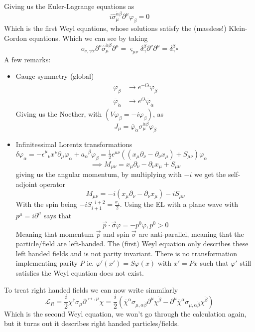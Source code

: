 \documentclass{report}
\begin{document}
Giving us the Euler-Lagrange equations as  \[
i \hat{\sigma}_\mu^{\dot{\alpha} \beta} \partial^{\mu} \varphi_\beta = 0 
\] Which is the first Weyl equations, whose solutions satisfy the (massless!) Klein-Gordon equations. Which we can see by taking \[
o_{\nu, \gamma \dot{\alpha}} \partial^{\nu} \hat{\sigma}_\mu^{\dot{\alpha} \beta} \partial^{\mu} = \varsigma_{\mu\nu} \delta_\gamma^{\beta} \partial^{\nu} \partial^{\mu} = \delta_\gamma^{\beta} \square     
\] 
A few remarks:
\begin{itemize}
  \item Gauge symmetry (global) 
    \begin{align*}
      \varphi_\beta &\to e^{-i\lambda} \varphi_\beta\\
      \overline{\varphi}_{\dot{\alpha}} &\to e^{i\lambda} \overline{\varphi}_{\dot{\alpha}} 
    \end{align*}
    Giving us the Noether, with $\left( V\varphi_\beta = -i \varphi_\beta \right) $, as \[
    J_\mu = \overline{\varphi}_{\dot{\alpha}} \sigma_\mu ^{\dot{\alpha} \beta} \varphi_\beta
    \] 
  \item Infinitessimal Lorentz transformations $\delta \varphi_\alpha = -\epsilon^{\mu}_{\text{ }\nu}  x^{\nu} \partial_\mu \varphi_\alpha + a_\alpha ^{\text{ }\beta} \varphi_\beta = \frac{1}{2} \epsilon^{\mu\nu} \left( \left( x_\mu \partial_\nu - \partial_\nu x_\mu \right) + S_{\mu\nu} \right) \varphi_\alpha $ \[
  \implies M_{\mu\nu} = x_\mu \partial_\nu - \partial_\nu x_\mu + S_{\mu\nu}   
  \] giving us the angular momentum, by multiplying with $-i$ we get the self-adjoint operator \[
  M_{\mu\nu} = -i\left( x_\mu \partial_\nu - \partial_\nu x_\mu   \right) - i S_{\mu\nu} 
  \] With the spin being $-i S_{i+1}^{\text{  }i+2} = \frac{\sigma_i}{2}  $.  Using the EL with a plane wave with $p^{\mu} = i \partial^{\mu} $ says that  \[
  \vec{p} \cdot \vec{\sigma} \varphi = - p^{0} \varphi , p^{0} > 0
\] Meaning that momentum $\vec{p}$ and spin $\vec{\sigma}$ are anti-parallel, meaning that the particle/field are left-handed. The (first) Weyl equation only describes these left handed fields and is not parity invariant. There is no transformation implementing parity $P$ ie. $\varphi'\left( x' \right) = S \varphi\left( x \right) $ with $x' = Px$ such that $\varphi'$ still satisfies the Weyl equation does not exist.
\end{itemize}
To treat right handed fields we can now write simmilarly 
\begin{equation*}
  \mathcal{L} _R = \frac{i}{2} \chi^\dagger \sigma_\mu \partial^{\leftrightarrow, \mu} \chi =
  \frac{i}{2} \left( \overline{\chi}^{\alpha} \sigma_{\mu, \alpha \dot{\beta}} \partial^{\mu} \chi^{\dot{\beta}} - \partial^{\mu} \overline{\chi} ^{\alpha} \sigma_{\mu, \alpha \dot{\beta}} \chi^{\dot{\beta}}  \right) 
\end{equation*} Which is the second Weyl equation, we won't go through the calculation again, but it turns out it describes right handed particles/fields.
\end{document}
